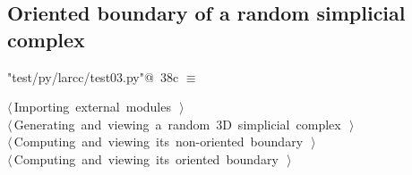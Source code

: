 \documentclass[11pt,oneside]{article}	%
\begin{document}
\subsection{Oriented boundary of a random simplicial complex}


\begin{flushleft} \small
\begin{minipage}{\linewidth} \label{scrap74}
\protect{}\verb@"test/py/larcc/test03.py"@\nobreak\ {\footnotesize 38c }$\equiv$
\vspace{-1ex}
\begin{list}{}{} \item
\mbox{}\verb@@\hbox{$\langle\,$Importing external modules\nobreak\ {\footnotesize {}}$\,\rangle$}\verb@@\\
\mbox{}\verb@@\hbox{$\langle\,$Generating and viewing a random 3D simplicial complex\nobreak\ {\footnotesize {}}$\,\rangle$}\verb@@\\
\mbox{}\verb@@\hbox{$\langle\,$Computing and viewing its non-oriented boundary\nobreak\ {\footnotesize {}}$\,\rangle$}\verb@@\\
\mbox{}\verb@@\hbox{$\langle\,$Computing and viewing its oriented boundary\nobreak\ {\footnotesize {}}$\,\rangle$}\verb@@\\
\mbox{}\verb@@{\NWsep}
\end{list}
\vspace{-2ex}
\end{minipage}\\[4ex]
\end{flushleft}
\end{document}
